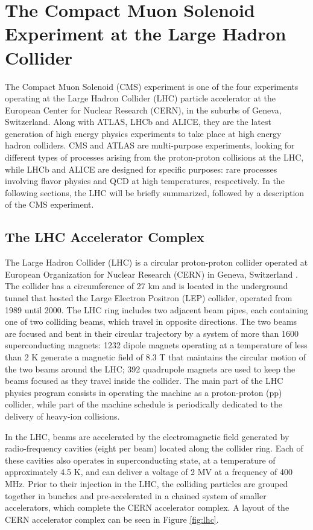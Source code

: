 \chapter{The Compact Muon Solenoid Experiment at the Large Hadron Collider}
\graphicspath{{cms/figures/}{cms/}}

The Compact Muon Solenoid (CMS) experiment is one of the four experiments operating at the Large Hadron Collider (LHC) particle accelerator at the European Center for Nuclear Research (CERN), in the suburbs of Geneva, Switzerland. 
Along with ATLAS, LHCb and ALICE, they are the latest generation of high energy physics experiments to take place at high energy hadron colliders. 
CMS and ATLAS are multi-purpose experiments, looking for different types of processes arising from the proton-proton collisions at the LHC, while LHCb and ALICE are designed for specific purposes: rare processes involving flavor physics and QCD at high temperatures, respectively.  
In the following sections, the LHC will be briefly summarized, followed by a description of the CMS experiment.

\section{The LHC Accelerator Complex}

The Large Hadron Collider (LHC) is a circular proton-proton collider operated at European Organization for Nuclear Research (CERN) in Geneva, Switzerland \cite{LHC}. 
The collider has a circumference of 27 km and is located in the underground tunnel that hosted the Large Electron Positron (LEP) collider, operated from 1989 until 2000. 
The LHC ring includes two adjacent beam pipes, each containing one of two colliding beams, which travel in opposite directions. 
The two beams are focused and bent in their circular trajectory by a system of more than 1600 superconducting magnets: 
1232 dipole magnets operating at a temperature of less than 2 K generate a magnetic field of 8.3 T that maintains the circular motion of the two beams around the LHC; 
392 quadrupole magnets are used to keep the beams focused as they travel inside the collider. 
The main part of the LHC physics program consists in operating the machine as a proton-proton (pp) collider, while part of the machine schedule is periodically dedicated to the delivery of heavy-ion collisions. 

In the LHC, beams are accelerated by the electromagnetic field generated by radio-frequency cavities (eight per beam) located along the collider ring. 
Each of these cavities also operates in superconducting state, at a temperature of approximately 4.5 K, and can deliver a voltage of 2 MV at a frequency of 400 MHz. 
Prior to their injection in the LHC, the colliding particles are grouped together in bunches and pre-accelerated in a chained system of smaller accelerators, which complete the CERN accelerator complex. 
A layout of the CERN accelerator complex can be seen in Figure \ref{fig:lhc}.

